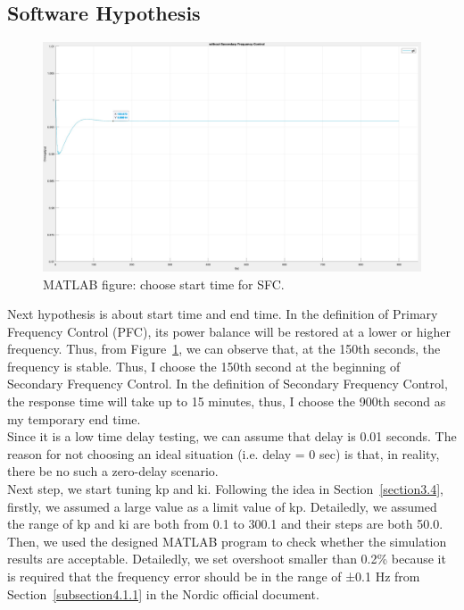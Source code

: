 \subsection{Software Hypothesis} %

\begin{figure}[htbp]
\centering
\includegraphics[width = .891\textwidth]{figure/4_1_1_without3.jpeg}
\caption{MATLAB figure: choose start time for SFC.}
\label{4_1_1_without3}
\end{figure}
Next hypothesis is about start time and end time. In the definition of Primary Frequency Control (PFC), its power balance will be restored at a lower or higher frequency. Thus, from Figure~\ref{4_1_1_without3}, we can observe that, at the 150th seconds, the frequency is stable. Thus, I choose the 150th second at the beginning of Secondary Frequency Control. In the definition of Secondary Frequency Control, the response time will take up to 15 minutes, thus, I choose the 900th second as my temporary end time. \\

Since it is a low time delay testing, we can assume that delay is 0.01 seconds. The reason for not choosing an ideal situation (i.e. delay = 0 sec) is that, in reality, there be no such a zero-delay scenario.\\

Next step, we start tuning kp and ki. Following the idea in Section~\ref{section3.4}, firstly, we assumed a large value as a limit value of kp. Detailedly, we assumed the range of kp and ki are both from 0.1 to 300.1 and their steps are both 50.0.  \\

Then, we used the designed MATLAB program to check whether the simulation results are acceptable. Detailedly, we set overshoot smaller than 0.2\% because it is required that the frequency error should be in the range of ±0.1 Hz from Section~\ref{subsection4.1.1} in the Nordic official document. \\

